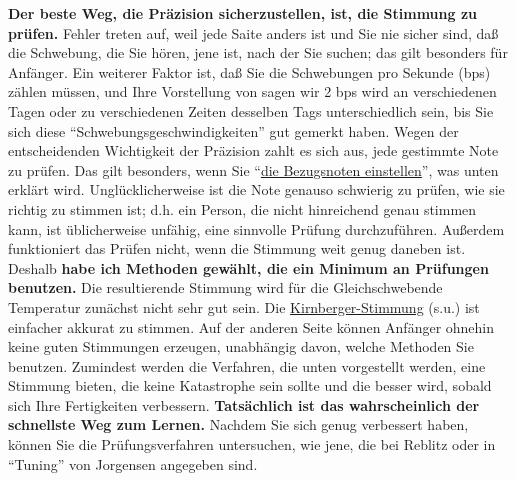 \textbf{Der beste Weg, die Präzision sicherzustellen, ist, die Stimmung zu prüfen.}
Fehler treten auf, weil jede Saite anders ist und Sie nie sicher sind, daß die Schwebung, die Sie hören, jene ist, nach der Sie suchen; das gilt besonders für Anfänger.
Ein weiterer Faktor ist, daß Sie die Schwebungen pro Sekunde (bps) zählen müssen, und Ihre Vorstellung von sagen wir 2 bps wird an verschiedenen Tagen oder zu verschiedenen Zeiten desselben Tags unterschiedlich sein, bis Sie sich diese \enquote{Schwebungsgeschwindigkeiten} gut gemerkt haben.
Wegen der entscheidenden Wichtigkeit der Präzision zahlt es sich aus, jede gestimmte Note zu prüfen.
Das gilt besonders, wenn Sie \enquote{\hyperref[c2_6]{die Bezugsnoten einstellen}}, was unten erklärt wird.
Unglücklicherweise ist die Note genauso schwierig zu prüfen, wie sie richtig zu stimmen ist; d.h. ein Person, die nicht hinreichend genau stimmen kann, ist üblicherweise unfähig, eine sinnvolle Prüfung durchzuführen.
Außerdem funktioniert das Prüfen nicht, wenn die Stimmung weit genug daneben ist.
Deshalb \textbf{habe ich Methoden gewählt, die ein Minimum an Prüfungen benutzen.}
Die resultierende Stimmung wird für die Gleichschwebende Temperatur zunächst nicht sehr gut sein.
Die \hyperref[c2_6_kirn]{Kirnberger-Stimmung} (s.u.) ist einfacher akkurat zu stimmen.
Auf der anderen Seite können Anfänger ohnehin keine guten Stimmungen erzeugen, unabhängig davon, welche Methoden Sie benutzen.
Zumindest werden die Verfahren, die unten vorgestellt werden, eine Stimmung bieten, die keine Katastrophe sein sollte und die besser wird, sobald sich Ihre Fertigkeiten verbessern.
\textbf{Tatsächlich ist das wahrscheinlich der schnellste Weg zum Lernen.}
Nachdem Sie sich genug verbessert haben, können Sie die Prüfungsverfahren untersuchen, wie jene, die bei Reblitz oder in \enquote{Tuning} von Jorgensen angegeben sind.
 


